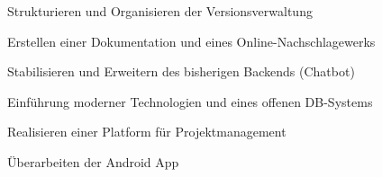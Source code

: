 \begin{frame}
\begin{block}{}
	Strukturieren und Organisieren der Versionsverwaltung
\end{block}
\begin{block}{}
	Erstellen einer Dokumentation und eines Online-Nachschlagewerks
\end{block}
\begin{block}{}
	Stabilisieren und Erweitern des bisherigen Backends (Chatbot)
\end{block}
\begin{block}{}
	Einführung moderner Technologien und eines offenen DB-Systems
\end{block}
\begin{block}{}
	Realisieren einer Platform für Projektmanagement
\end{block}
\begin{block}{}
	Überarbeiten der Android App
\end{block}
\end{frame}